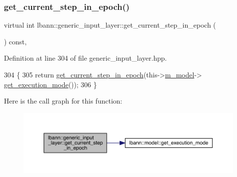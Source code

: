 \subsubsection{\texorpdfstring{get\+\_\+current\+\_\+step\+\_\+in\+\_\+epoch()}{get\_current\_step\_in\_epoch()}\hspace{0.1cm}{\footnotesize\ttfamily [2/2]}}
{\footnotesize\ttfamily virtual int lbann\+::generic\+\_\+input\+\_\+layer\+::get\+\_\+current\+\_\+step\+\_\+in\+\_\+epoch (\begin{DoxyParamCaption}{ }\end{DoxyParamCaption}) const\hspace{0.3cm}{\ttfamily [inline]}, {\ttfamily [virtual]}}



Definition at line 304 of file generic\+\_\+input\+\_\+layer.\+hpp.


\begin{DoxyCode}
304                                                 \{
305     \textcolor{keywordflow}{return} \hyperlink{classlbann_1_1generic__input__layer_a660d82888a5c1eb72c2906d6367cbc35}{get\_current\_step\_in\_epoch}(this->\hyperlink{classlbann_1_1Layer_a3d9315e99574166f2f33e37b572021d2}{m\_model}->
      \hyperlink{classlbann_1_1model_addb40597cf29aa6d31b6a7d09ef48608}{get\_execution\_mode}());
306   \}
\end{DoxyCode}
Here is the call graph for this function\+:\nopagebreak
\begin{figure}[H]
\begin{center}
\leavevmode
\includegraphics[width=350pt]{classlbann_1_1generic__input__layer_a660d82888a5c1eb72c2906d6367cbc35_cgraph}
\end{center}
\end{figure}
\mbox{\label{classlbann_1_1generic__input__layer_a8c3bf45beb91622d56f0dec89cba8e9a}} 

